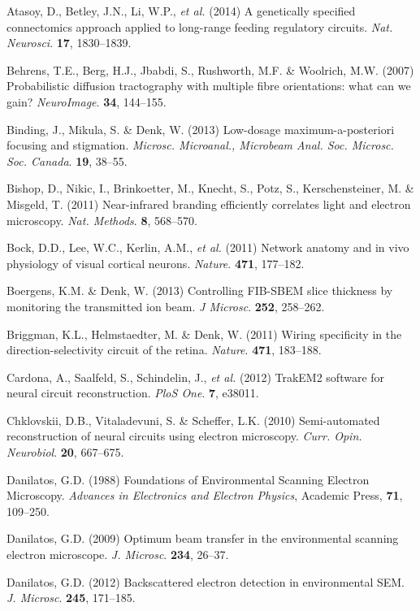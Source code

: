 \documentclass{article}
\begin{document}
\begin{hangpars}\small
Atasoy, D., Betley, J.N., Li, W.P., \emph{et al.} (2014) A genetically specified connectomics approach applied to long-range feeding regulatory circuits. \emph{Nat. Neurosci}. \textbf{17}, 1830–1839.

Behrens, T.E., Berg, H.J., Jbabdi, S., Rushworth, M.F. \& Woolrich, M.W. (2007) Probabilistic diffusion tractography with multiple fibre orientations: what can we gain? \emph{NeuroImage}. \textbf{34}, 144–155.

Binding, J., Mikula, S. \& Denk, W. (2013) Low-dosage maximum-a-posteriori focusing and stigmation. \emph{Microsc. Microanal., Microbeam Anal. Soc. Microsc. Soc. Canada}. \textbf{19}, 38–55.

Bishop, D., Nikic, I., Brinkoetter, M., Knecht, S., Potz, S., Kerschensteiner, M. \& Misgeld, T. (2011) Near-infrared branding efficiently correlates light and electron microscopy. \emph{Nat. Methods}. \textbf{8}, 568–570.

Bock, D.D., Lee, W.C., Kerlin, A.M., \emph{et al.} (2011) Network anatomy and in vivo physiology of visual cortical neurons. \emph{Nature}. \textbf{471}, 177–182.

Boergens, K.M. \& Denk, W. (2013) Controlling FIB-SBEM slice thickness by monitoring the transmitted ion beam. \emph{J Microsc}. \textbf{252}, 258–262.

Briggman, K.L., Helmstaedter, M. \& Denk, W. (2011) Wiring specificity in the direction-selectivity circuit of the retina. \emph{Nature}. \textbf{471}, 183–188.

Cardona, A., Saalfeld, S., Schindelin, J., \emph{et al.} (2012) TrakEM2 software for neural circuit reconstruction. \emph{PloS One}. \textbf{7}, e38011.

Chklovskii, D.B., Vitaladevuni, S. \& Scheffer, L.K. (2010) Semi-automated reconstruction of neural circuits using electron microscopy. \emph{Curr. Opin. Neurobiol}. \textbf{20}, 667–675.

Danilatos, G.D. (1988) Foundations of Environmental Scanning Electron Microscopy. \emph{Advances in Electronics and Electron Physics}, Academic Press, \textbf{71}, 109–250.

Danilatos, G.D. (2009) Optimum beam transfer in the environmental scanning electron microscope. \emph{J. Microsc}. \textbf{234}, 26–37.

Danilatos, G.D. (2012) Backscattered electron detection in environmental SEM. \emph{J. Microsc}. \textbf{245}, 171–185.


\end{hangpars}
\end{document}
